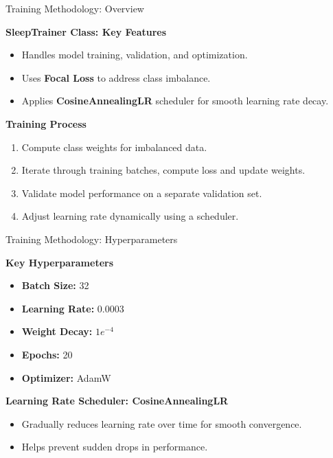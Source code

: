 \begin{frame}{Training Methodology: Overview}

    \textbf{\large SleepTrainer Class: Key Features}
    \vspace{5pt}
    \begin{itemize}
        \item Handles model training, validation, and optimization.
        \item Uses \textbf{Focal Loss} to address class imbalance.
        \item Applies \textbf{CosineAnnealingLR} scheduler for smooth learning rate decay.
    \end{itemize}

    \vspace{10pt}
    \textbf{\large Training Process}
    \vspace{5pt}
    \begin{enumerate}
        \item Compute class weights for imbalanced data.
        \item Iterate through training batches, compute loss and update weights.
        \item Validate model performance on a separate validation set.
        \item Adjust learning rate dynamically using a scheduler.
    \end{enumerate}

\end{frame}


\begin{frame}{Training Methodology: Hyperparameters}

    \textbf{\large Key Hyperparameters}
    \vspace{5pt}
    \begin{itemize}
        \item \textbf{Batch Size:} 32  \hfill 
        \item \textbf{Learning Rate:} 0.0003  \hfill
        \item \textbf{Weight Decay:} \( 1e^{-4} \)  \hfill 
        \item \textbf{Epochs:} 20  \hfill 
        \item \textbf{Optimizer:} AdamW  \hfill 
    \end{itemize}

    \vspace{10pt}
    \textbf{\large Learning Rate Scheduler: CosineAnnealingLR}
    \begin{itemize}
        \item Gradually reduces learning rate over time for smooth convergence.
        \item Helps prevent sudden drops in performance.
    \end{itemize}

\end{frame}

